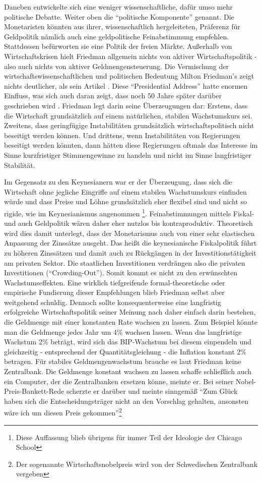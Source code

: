 Daneben entwickelte sich eine weniger wissenschaftliche, dafür umso mehr politische Debatte. Weiter oben die "`politische Komponente"' genannt. Die Monetaristen könnten aus ihrer, wissenschaftlich hergeleiteten, Präferenz für Geldpolitik nämlich auch eine geldpolitische Feinabstimmung empfehlen. Stattdessen befürworten sie eine Politik der freien Märkte. Außerhalb von Wirtschaftskrisen hielt Friedman allgemein nichts von aktiver Wirtschaftspolitik - also auch nichts von aktiver Geldmengensteuerung. Die Vermischung der wirtschaftswissenschaftlichen und politischen Bedeutung Milton Friedman's zeigt nichts deutlicher, als sein Artikel \textcite{Friedman1968}. Diese "`Presidential Address"' hatte enormen Einfluss, was sich auch daran zeigt, dass noch 50 Jahre später darüber geschrieben wird \parencite{Mankiw2018}. Friedman legt darin seine Überzeugungen dar: Erstens, dass die Wirtschaft grundsätzlich auf einem natürlichen, stabilen Wachstumskurs sei. Zweitens, dass geringfügige Instabilitäten grundsätzlich wirtschaftspolitisch nicht beseitigt werden können. Und drittens, wenn Instabilitäten von Regierungen beseitigt werden könnten, dann hätten diese Regierungen oftmals das Interesse im Sinne kurzfristiger Stimmengewinne zu handeln und nicht im Sinne langfristiger Stabilität. 

Im Gegensatz zu den Keynesianern war er der Überzeugung, dass sich die Wirtschaft ohne jegliche Eingriffe auf einem stabilen Wachstumskurs einfinden würde und dass Preise und Löhne grundsätzlich eher flexibel sind und nicht so rigide, wie im Keynesianismus angenommen \footnote{Diese Auffassung blieb übrigens für immer Teil der Ideologie der Chicago School}. Feinabstimmungen mittels Fiskal- und auch Geldpolitik wären daher eher nutzlos bis kontraproduktiv. Theoretisch wird dies damit unterlegt, dass der Monetarismus auch von einer sehr elastischen Anpassung der Zinssätze ausgeht. Das heißt die keynesianische Fiskalpolitik führt zu höheren Zinssätzen und damit auch zu Rückgängen in der Investitionstätigkeit am privaten Sektor. Die staatlichen Investitionen verdrängen also die privaten Investitionen ("`Crowding-Out"'). Somit kommt es nicht zu den erwünschten Wachstumseffekten. Eine wirklich tiefgreifende formal-theoretische oder empirische Fundierung dieser Empfehlungen blieb Friedman selbst aber weitgehend schuldig.
Dennoch sollte konsequenterweise eine langfristig erfolgreiche Wirtschaftspolitik seiner Meinung nach daher einfach darin bestehen, die Geldmenge mit einer konstanten Rate wachsen zu lassen. Zum Beispiel könnte man die Geldmenge jedes Jahr um 4\% wachsen lassen. Wenn das langfristige Wachstum 2\% beträgt, wird sich das BIP-Wachstum bei diesem einpendeln und gleichzeitig - entsprechend der Quantitätsgleichung - die Inflation konstant 2\% betragen. Für stabiles Geldmengenwachstum brauche es laut Friedman keine Zentralbank. Die Geldmenge konstant wachsen zu lassen schaffe schließlich auch ein Computer, der die Zentralbanken ersetzen könne, meinte er. Bei seiner Nobel-Preis-Bankett-Rede \parencite{Friedman1976b} scherzte er darüber und meinte sinngemäß "`Zum Glück haben sich die Entscheidungsträger nicht an den Vorschlag gehalten, ansonsten wäre ich um diesen Preis gekommen"'\footnote{Der sogenannte Wirtschaftsnobelpreis wird von der Schwedischen Zentralbank vergeben}

